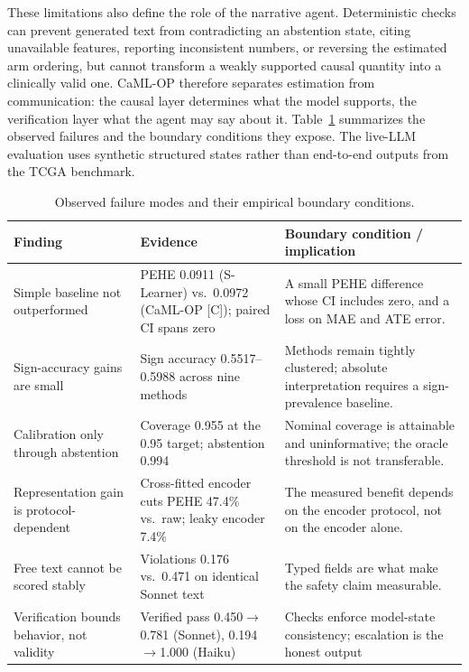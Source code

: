 \documentclass{article}
\begin{document}
These limitations also define the role of the narrative agent. Deterministic checks can prevent generated text from contradicting an abstention state, citing unavailable features, reporting inconsistent numbers, or reversing the estimated arm ordering, but cannot transform a weakly supported causal quantity into a clinically valid one. CaML-OP therefore separates estimation from communication: the causal layer determines what the model supports, the verification layer what the agent may say about it. Table~\ref{tab:failure} summarizes the observed failures and the boundary conditions they expose. The live-LLM evaluation uses synthetic structured states rather than end-to-end outputs from the TCGA benchmark.

\begin{table}[t]
\caption{Observed failure modes and their empirical boundary conditions.}
\label{tab:failure}
\centering\footnotesize
\setlength{\tabcolsep}{4pt}
\begin{tabular}{p{}p{}p{}}\toprule
Finding & Evidence & Boundary condition / implication\\\midrule
Simple baseline not outperformed & PEHE 0.0911 (S-Learner) vs.\ 0.0972 (CaML-OP [C]); paired CI spans zero & A small PEHE difference whose CI includes zero, and a loss on MAE and ATE error.\\
Sign-accuracy gains are small & Sign accuracy 0.5517--0.5988 across nine methods & Methods remain tightly clustered; absolute interpretation requires a sign-prevalence baseline.\\
Calibration only through abstention & Coverage 0.955 at the 0.95 target; abstention 0.994 & Nominal coverage is attainable and uninformative; the oracle threshold is not transferable.\\
Representation gain is protocol-dependent & Cross-fitted encoder cuts PEHE 47.4\% vs.\ raw; leaky encoder 7.4\% & The measured benefit depends on the encoder protocol, not on the encoder alone.\\
Free text cannot be scored stably & Violations 0.176 vs.\ 0.471 on identical Sonnet text & Typed fields are what make the safety claim measurable.\\
Verification bounds behavior, not validity & Verified pass 0.450$\rightarrow$0.781 (Sonnet), 0.194$\rightarrow$1.000 (Haiku) & Checks enforce model-state consistency; escalation is the honest output\\\bottomrule
\end{tabular}
\end{table}
\end{document}
